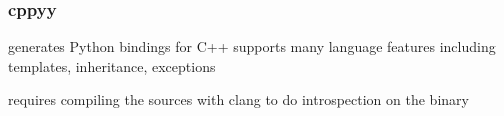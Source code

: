 \subsubsection{cppyy}

generates Python bindings for C++
supports many language features including templates, inheritance, exceptions

requires compiling the sources with clang to do introspection on the binary

%
%
%
%
%
%
%
%
%
%
%
%
%
%
%


